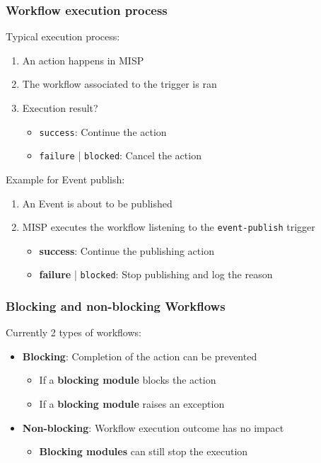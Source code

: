 \begin{frame}
    \frametitle{Workflow execution process}
    Typical execution process:
    \begin{enumerate}
        \item An action happens in MISP
        \item The workflow associated to the trigger is ran
        \item Execution result?
        \begin{itemize}
            \item \texttt{\color{green!50!black}success}: Continue the action
            \item \texttt{\color{red}failure} | \texttt{\color{blue}blocked}: Cancel the action
        \end{itemize}
    \end{enumerate}
    \vspace{0.5em}
    Example for Event publish:
    \begin{enumerate}
        \item An Event is about to be published
        \item MISP executes the workflow listening to the \texttt{event-publish} trigger
        \begin{itemize}
            \item {\bf\color{green!50!black}success}: Continue the publishing action
            \item {\bf\color{red}failure} | \texttt{\color{blue}blocked}: Stop publishing and log the reason
        \end{itemize}
    \end{enumerate}
\end{frame}

\begin{frame}
    \frametitle{Blocking and non-blocking Workflows}
    Currently 2 types of workflows:
    \vspace{0.5em}
    \begin{itemize}
        \item {\bf Blocking}: Completion of the action can be prevented
        \begin{itemize}
            \item If a \textbf{blocking module} blocks the action
            \item If a \textbf{blocking module} raises an exception
        \end{itemize}
        \vspace{0.5em}
        \item {\bf Non-blocking}: Workflow execution outcome has no impact
        \begin{itemize}
            \item \textbf{Blocking modules} can still stop the execution
        \end{itemize}
    \end{itemize}
\end{frame}

